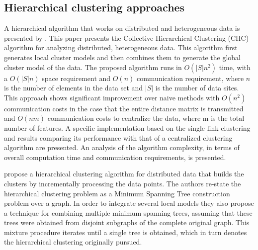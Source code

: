 \documentclass[a4paper]{article}
\begin{document}
\subsection{Hierarchical clustering approaches}

A hierarchical algorithm that works on distributed and heterogeneous data is presented by \cite{JK00}.  This paper presents the Collective Hierarchical Clustering (CHC) algorithm for analyzing distributed, heterogeneous data. This algorithm first generates local cluster models and then combines them to generate the global cluster model of the data. The proposed algorithm runs in $O(|S|n^2)$ time, with a $O(|S|n)$ space requirement and $O(n)$ communication requirement, where $n$ is the number of elements in the data set and $|S|$ is the number of data sites. This approach shows significant improvement over naive methods with $O(n^2)$ communication costs in the case that the entire distance matrix is transmitted and $O(nm)$ communication costs to centralize the data, where m is the total number of features. A specific implementation based on the single link clustering and results comparing its performance with that of a centralized clustering algorithm are presented. An analysis of the algorithm complexity, in terms of overall computation time and communication requirements, is presented.

\cite{JCHAC15} propose a hierarchical clustering algorithm for distributed data that builds the clusters by incrementally processing the data points. The authors re-state the hierarchical clustering problem as a Minimum Spanning Tree construction problem over a graph. In order to integrate several local models they also propose a technique for combining multiple minimum spanning trees, assuming that these trees were obtained from disjoint subgraphs of the complete original graph. This mixture procedure iterates until a single tree is obtained, which in turn denotes the hierarchical clustering originally pursued. 
\end{document}
